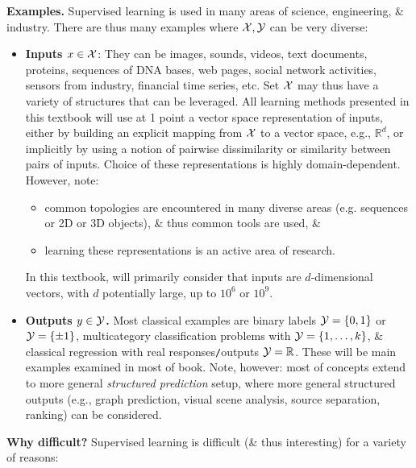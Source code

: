 \documentclass{article}
\begin{document}
{\bf Examples.} Supervised learning is used in many areas of science, engineering, \& industry. There are thus many examples where ${\cal X},{\cal Y}$ can be very diverse:
\begin{itemize}
	\item {\bf Inputs $x\in{\cal X}$}: They can be images, sounds, videos, text documents, proteins, sequences of DNA bases, web pages, social network activities, sensors from industry, financial time series, etc. Set ${\cal X}$ may thus have a variety of structures that can be leveraged. All learning methods presented in this textbook will use at 1 point a vector space representation of inputs, either by building an explicit mapping from ${\cal X}$ to a vector space, e.g., $\mathbb{R}^d$, or implicitly by using a notion of pairwise dissimilarity or similarity between pairs of inputs. Choice of these representations is highly domain-dependent. However, note:
	\begin{itemize}
		\item common topologies are encountered in many diverse areas (e.g. sequences or 2D or 3D objects), \& thus common tools are used, \&
		\item learning these representations is an active area of research.
	\end{itemize}
	In this textbook, will primarily consider that inputs are $d$-dimensional vectors, with $d$ potentially large, up to $10^6$ or $10^9$.
	\item {\bf Outputs $y\in{\cal Y}$.} Most classical examples are binary labels ${\cal Y} = \{0,1\}$ or ${\cal Y} = \{\pm1\}$, multicategory classification problems with ${\cal Y} = \{1,\ldots,k\}$, \& classical regression with real responses{\tt/}outputs ${\cal Y} = \mathbb{R}$. These will be main examples examined in most of book. Note, however: most of concepts extend to more general \emph{structured prediction} setup, where more general structured outputs (e.g., graph prediction, visual scene analysis, source separation, ranking) can be considered.
\end{itemize}
{\bf Why difficult?} Supervised learning is difficult (\& thus interesting) for a variety of reasons:
\end{document}

